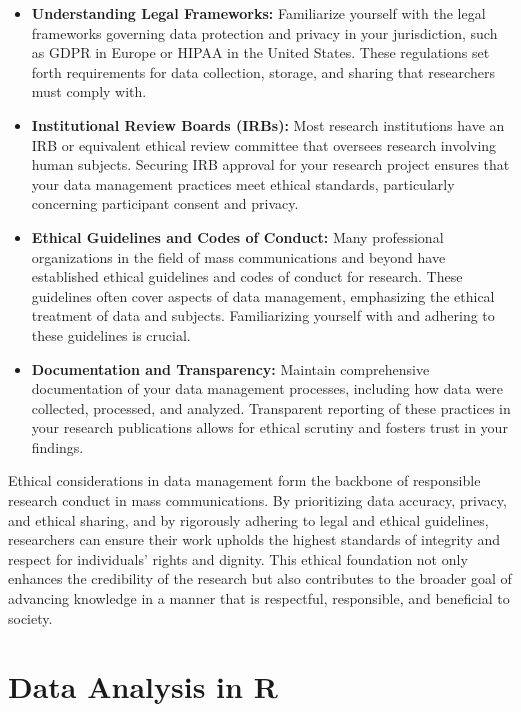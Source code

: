 \documentclass[
]{book}
\begin{document}
\begin{itemize}
\item
  \textbf{Understanding Legal Frameworks:} Familiarize yourself with the legal frameworks governing data protection and privacy in your jurisdiction, such as GDPR in Europe or HIPAA in the United States. These regulations set forth requirements for data collection, storage, and sharing that researchers must comply with.
\item
  \textbf{Institutional Review Boards (IRBs):} Most research institutions have an IRB or equivalent ethical review committee that oversees research involving human subjects. Securing IRB approval for your research project ensures that your data management practices meet ethical standards, particularly concerning participant consent and privacy.
\item
  \textbf{Ethical Guidelines and Codes of Conduct:} Many professional organizations in the field of mass communications and beyond have established ethical guidelines and codes of conduct for research. These guidelines often cover aspects of data management, emphasizing the ethical treatment of data and subjects. Familiarizing yourself with and adhering to these guidelines is crucial.
\item
  \textbf{Documentation and Transparency:} Maintain comprehensive documentation of your data management processes, including how data were collected, processed, and analyzed. Transparent reporting of these practices in your research publications allows for ethical scrutiny and fosters trust in your findings.
\end{itemize}

Ethical considerations in data management form the backbone of responsible research conduct in mass communications. By prioritizing data accuracy, privacy, and ethical sharing, and by rigorously adhering to legal and ethical guidelines, researchers can ensure their work upholds the highest standards of integrity and respect for individuals' rights and dignity. This ethical foundation not only enhances the credibility of the research but also contributes to the broader goal of advancing knowledge in a manner that is respectful, responsible, and beneficial to society.

\hypertarget{data-analysis-in-r}{%
\chapter{Data Analysis in R}\label{data-analysis-in-r}}
\end{document}
